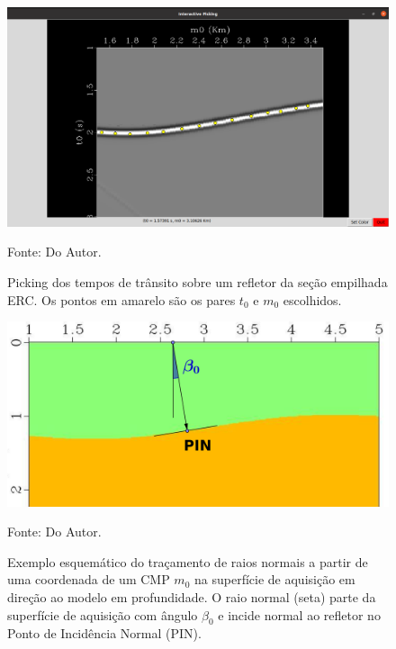 \begin{figure}[H]
\caption{Picking dos tempos de trânsito sobre um refletor da seção empilhada ERC. Os pontos
em amarelo são os pares $t_0$ e $m_0$ escolhidos.}
\begin{center}
\includegraphics[scale=0.3]{images/picking.png}
\vspace{-0.3cm}
\end{center}
\begin{center}
 Fonte: Do Autor.
\end{center}
\label{fig:9.2}
\end{figure}

\begin{figure}[H]
\caption{Exemplo esquemático do traçamento de raios normais a partir de uma coordenada de um CMP $m_0$
na superfície de aquisição em direção ao modelo em profundidade.
O raio normal (seta) parte da superfície de aquisição com ângulo $\beta_0$ e incide normal
ao refletor no Ponto de Incidência Normal (PIN).}
\begin{center}
\includegraphics[scale=0.5]{images/modelagem.png}
\vspace{-0.3cm}
\end{center}
\begin{center}
 Fonte: Do Autor.
\end{center}
\label{fig:9.3}
\end{figure}

